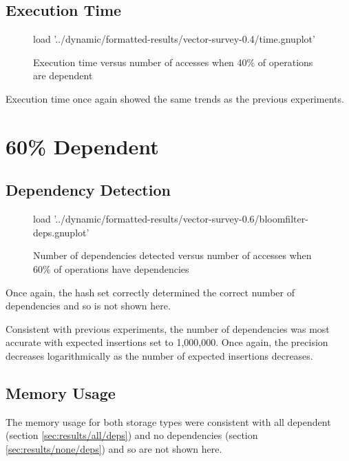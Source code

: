 	\subsection{Execution Time} \label{sec:results/40/time}
	\begin{figure}
		\centering
		\begin{gnuplot}[terminal=pdf]
			load '../dynamic/formatted-results/vector-survey-0.4/time.gnuplot'
		\end{gnuplot}
		\caption{Execution time versus number of accesses when 40\% of operations are dependent}
		\label{chart:40-time}
	\end{figure}
	
	Execution time once again showed the same trends as the previous experiments.
	
\section{60\% Dependent} \label{sec:results/60}
	\subsection{Dependency Detection} \label{sec:results/60/deps}
	\begin{figure}
		\centering
		\begin{gnuplot}[terminal=pdf]
			load '../dynamic/formatted-results/vector-survey-0.6/bloomfilter-deps.gnuplot'
		\end{gnuplot}
		\caption{Number of dependencies detected versus number of accesses when 60\% of operations have dependencies}
		\label{chart:60-dep}
	\end{figure}
	
	Once again, the hash set correctly determined the correct number of dependencies and so is not shown here.
		
	Consistent with previous experiments, the number of dependencies was most accurate with expected insertions set to 1,000,000. Once again, the precision decreases logarithmically as the number of expected insertions decreases.
	
	\subsection{Memory Usage} \label{sec:results/60/mem}
	The memory usage for both storage types were consistent with all dependent (section \ref{sec:results/all/deps}) and no dependencies (section \ref{sec:results/none/deps}) and so are not shown here.
	
